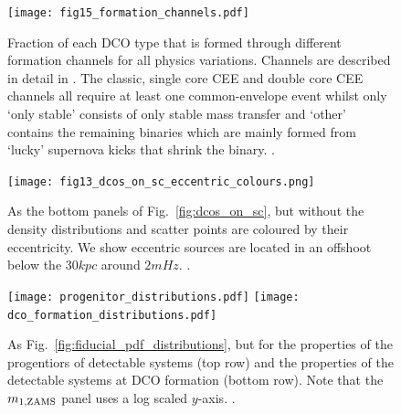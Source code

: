 \begin{figure}[p]
    \centering
    \texttt{[image: fig15\_formation\_channels.pdf]}
    \caption{Fraction of each DCO type that is formed through different formation channels for all physics variations. Channels are described in detail in \citet{Broekgaarden+2021}. The classic, single core CEE and double core CEE channels all require at least one common-envelope event whilst only `only stable' consists of only stable mass transfer and `other' contains the remaining binaries which are mainly formed from `lucky' supernova kicks that shrink the binary. \href{https://github.com/TomWagg/detecting-DCOs-in-LISA/blob/main/paper/figures/fig15_formation_channels.pdf}{\faFileImage} \href{https://github.com/TomWagg/detecting-DCOs-in-LISA/blob/main/paper/figure_notebooks/formation_channels.ipynb}{\faBook}.}
    \label{fig:formation_channels}
\end{figure}

\begin{figure}[b]
    \centering
    \texttt{[image: fig13\_dcos\_on\_sc\_eccentric\_colours.png]}
    \caption{As the bottom panels of Fig.~\ref{fig:dcos_on_sc}, but without the density distributions and scatter points are coloured by their eccentricity. We show eccentric sources are located in an offshoot below the $30 \unit{kpc}$ around $2 \unit{mHz}$. \href{https://github.com/TomWagg/detecting-DCOs-in-LISA/blob/main/paper/figures/fig13_dcos_on_sc_eccentric_colours.png}{\faFileImage} \href{https://github.com/TomWagg/detecting-DCOs-in-LISA/blob/main/paper/figure_notebooks/sensitivity_curve.ipynb}{\faBook}.}
    \label{fig:dcos_on_sc_ecc_col}
\end{figure}

\begin{figure}[ht]
    \centering
    \texttt{[image: progenitor\_distributions.pdf]}
    \texttt{[image: dco\_formation\_distributions.pdf]}
    \caption{As Fig.~\ref{fig:fiducial_pdf_distributions}, but for the properties of the progentiors of detectable systems (top row) and the properties of the detectable systems at DCO formation (bottom row). Note that the $m_{1, {\rm ZAMS}}$ panel uses a log scaled $y$-axis. \href{https://github.com/TomWagg/detecting-DCOs-in-LISA/blob/main/paper/figures/progenitor_distributions.pdf}{\faFileImage} \href{https://github.com/TomWagg/detecting-DCOs-in-LISA/blob/main/paper/figures/dco_formation_distributions.pdf}{\faFileImage} \href{https://github.com/TomWagg/detecting-DCOs-in-LISA/blob/main/paper/figure_notebooks/fiducial.ipynb}{\faBook}.}
    \label{fig:progenitor_and_dco_properties}
\end{figure}

